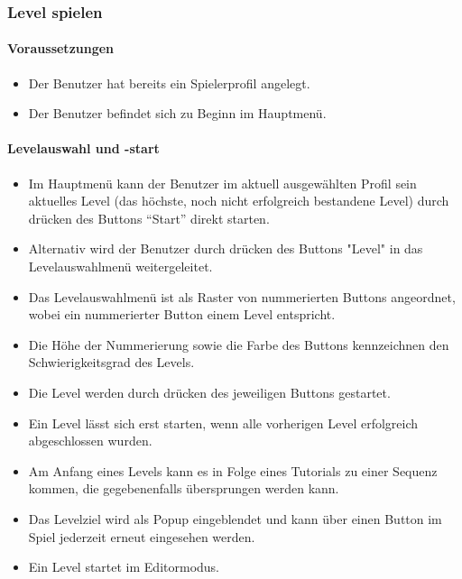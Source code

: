 \subsubsection{Level spielen}
\paragraph{Voraussetzungen}
\begin{itemize}
	\item Der Benutzer hat bereits ein Spielerprofil angelegt.
	\item Der Benutzer befindet sich zu Beginn im Hauptmenü.
\end{itemize}
\paragraph{Levelauswahl und -start}
\begin{itemize}
	\item Im Hauptmenü kann der Benutzer im aktuell ausgewählten Profil sein aktuelles Level (das höchste, noch nicht erfolgreich bestandene Level) durch drücken des Buttons "`Start"' direkt starten.
	\item Alternativ wird der Benutzer durch drücken des Buttons "Level" in das Levelauswahlmenü weitergeleitet.
	\item Das Levelauswahlmenü ist als Raster von nummerierten Buttons angeordnet, wobei ein nummerierter Button einem Level entspricht.
	\item Die Höhe der Nummerierung sowie die Farbe des Buttons kennzeichnen den Schwierigkeitsgrad des Levels.
	\item Die Level werden durch drücken des jeweiligen Buttons gestartet.
	\item Ein Level lässt sich erst starten, wenn alle vorherigen Level erfolgreich abgeschlossen wurden.
	\item Am Anfang eines Levels kann es in Folge eines Tutorials zu einer Sequenz kommen, die gegebenenfalls übersprungen werden kann.
	\item Das Levelziel wird als Popup eingeblendet und kann über einen Button im Spiel jederzeit erneut eingesehen werden.
	\item Ein Level startet im Editormodus.
\end{itemize}

